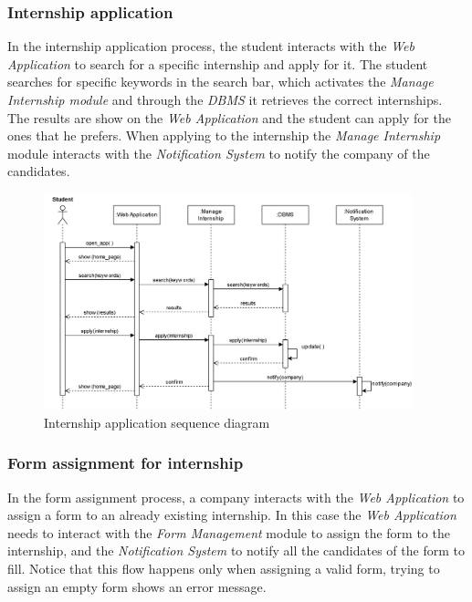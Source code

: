 \documentclass[11pt,twoside]{article}
\begin{document}
\newpage

		\subsubsection{Internship application}
In the internship application process, the student interacts with the \textit{Web Application} to search for a specific internship and apply for it. The student searches for specific keywords in the search bar, which activates the \textit{Manage Internship module} and through the \textit{DBMS} it retrieves the correct internships. The results are show on the \textit{Web Application} and the student can apply for the ones that he prefers. When applying to the internship the \textit{Manage Internship} module interacts with the \textit{Notification System} to notify the company of the candidates.

\begin{figure}[H]
\centering
\includegraphics[width=0.95\textwidth]{Images/Seq4}
\caption{Internship application sequence diagram}\label{Seq4}
\end{figure}

\newpage

		\subsubsection{Form assignment for internship}
In the form assignment process, a company interacts with the \textit{Web Application} to assign a form to an already existing internship. In this case the \textit{Web Application} needs to interact with the \textit{Form Management} module to assign the form to the internship, and the \textit{Notification System} to notify all the candidates of the form to fill. Notice that this flow happens only when assigning a valid form, trying to assign an empty form shows an error message.
		
\end{document}
